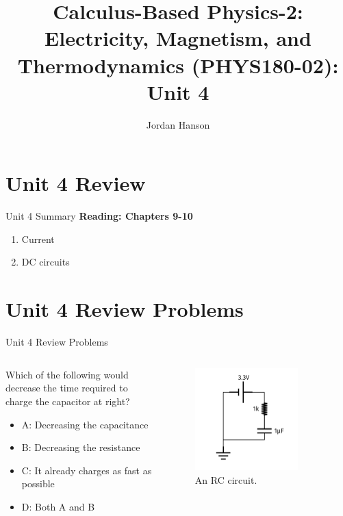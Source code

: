 \documentclass{beamer}
\title{Calculus-Based Physics-2: Electricity, Magnetism, and Thermodynamics (PHYS180-02): Unit 4}
\author{Jordan Hanson}
\institute{Whittier College Department of Physics and Astronomy}
\begin{document}
\maketitle

\section{Unit 4 Review}

\begin{frame}{Unit 4 Summary}
\textbf{Reading: Chapters 9-10}
\begin{enumerate}
\item Current
\item DC circuits
\end{enumerate}
\end{frame}

\section{Unit 4 Review Problems}

\begin{frame}{Unit 4 Review Problems}
\begin{columns}[T]
\begin{column}{0.5\textwidth}
Which of the following would decrease the time required to charge the capacitor at right?
\begin{itemize}
\item A: Decreasing the capacitance
\item B: Decreasing the resistance
\item C: It already charges as fast as possible
\item D: Both A and B
\end{itemize}
\end{column}
\begin{column}{0.5\textwidth}
\begin{figure}
\centering
\includegraphics[width=0.8\textwidth]{figures/iVCurve7.pdf}
\caption{\label{fig:RC0} An RC circuit.}
\end{figure}
\end{column}
\end{columns}
\end{frame}
\end{document}
